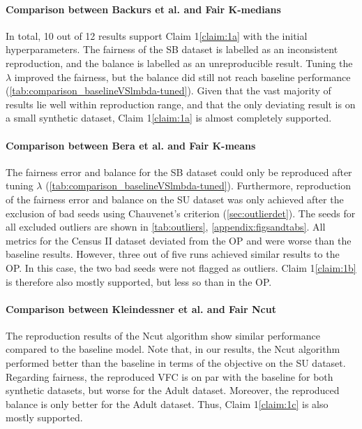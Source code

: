\paragraph{Comparison between Backurs et al. and Fair $\mathbf{K}$-medians} In total,
10 out of 12 results support Claim 1\ref{claim:1a} with the initial hyperparameters. The fairness of the SB dataset is labelled as an inconsistent reproduction, and the balance is labelled as an unreproducible result. Tuning the $\lambda$ improved the fairness, but the balance did still not reach baseline performance (\autoref{tab:comparison_baselineVSlmbda-tuned}). Given that the vast majority of results lie well within reproduction range, and that the only deviating result is on a small synthetic dataset, Claim 1\ref{claim:1a} is almost completely supported. 

\paragraph{Comparison between Bera et al. and Fair $\mathbf{K}$-means}\label{ssec:comparisonkmeans} The fairness error and balance for the SB dataset could only be reproduced after tuning $\lambda$ (\autoref{tab:comparison_baselineVSlmbda-tuned}). Furthermore, reproduction of the fairness error and balance on the SU dataset was only achieved after the exclusion of bad seeds using Chauvenet's criterion (\autoref{sec:outlierdet}). The seeds for all excluded outliers are shown in \autoref{tab:outliers}, \autoref{appendix:figsandtabs}.
All metrics for the Census II dataset deviated from the OP and were worse than the baseline results. However, three out of five runs achieved similar results to the OP. In this case, the two bad seeds were not flagged as outliers.
Claim 1\ref{claim:1b} is therefore also mostly supported, but less so than in the OP.

\paragraph{Comparison between Kleindessner et al. and Fair Ncut} 
The reproduction results of the Ncut algorithm show similar performance compared to the baseline model. Note that, in our results, the Ncut algorithm performed better than the baseline in terms of the objective on the SU dataset. Regarding fairness, the reproduced VFC is on par with the baseline for both synthetic datasets, but worse for the Adult dataset. Moreover, the reproduced balance is only better for the Adult dataset. Thus, Claim 1\ref{claim:1c} is also mostly supported.

